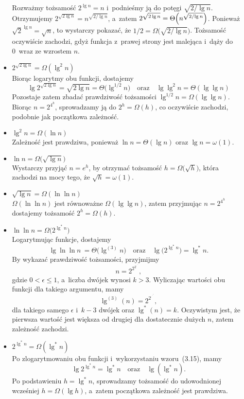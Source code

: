 \begin{itemize}
	Rozważmy tożsamość $2^{\lg n}=n$ i~podnieśmy ją do potęgi $\sqrt{2/\!\lg n}$. Otrzymujemy $2^{\sqrt{2\lg n}}=n^{\sqrt{2/\!\lg n}}$, a~zatem $2^{\sqrt{2\lg n}}=\Theta\Bigl(n^{\sqrt{2/\!\lg n}}\Bigr)$. Ponieważ $\sqrt{2}^{\lg n}=\sqrt{n}$, to wystarczy pokazać, że $1/2=\Omega\bigl(\!\sqrt{2/\!\lg n}\bigr)$. Tożsamość oczywiście zachodzi, gdyż funkcja z~prawej strony jest malejąca i~dąży do 0~wraz ze wzrostem $n$.
\item $2^{\sqrt{2\lg n}}=\Omega(\lg^2 n)$ \\
	Biorąc logarytmy obu funkcji, dostajemy
	\[
		\lg2^{\sqrt{2\lg n}} = \sqrt{2\lg n} = \Theta\bigl(\lg^{1/2}n\bigr) \quad\text{oraz}\quad \lg\lg^2n = \Theta(\lg\lg n)
	\]
	Pozostaje zatem zbadać prawdziwość tożsamości $\lg^{1/2}n=\Omega(\lg\lg n)$. Biorąc $n=2^{4^h}$, sprowadzamy ją do $2^h=\Omega(h)$, co oczywiście zachodzi, podobnie jak początkowa zależność.
\item $\lg^2n=\Omega(\ln n)$ \\
	Zależność jest prawdziwa, ponieważ $\ln n=\Theta(\lg n)$ oraz $\lg n=\omega(1)$.
\item $\ln n=\Omega\bigl(\!\sqrt{\lg n}\bigr)$ \\
	Wystarczy przyjąć $n=e^h$, by otrzymać tożsamość $h=\Omega\bigl(\!\sqrt{h}\bigr)$, która zachodzi na mocy tego, że $\sqrt{h}=\omega(1)$.
\item $\sqrt{\lg n}=\Omega(\ln\ln n)$ \\
	$\Omega(\ln\ln n)$ jest równoważne $\Omega(\lg\lg n)$, zatem przyjmując $n=2^{4^h}$ dostajemy tożsamość $2^h=\Omega(h)$.
\item $\ln\ln n=\Omega\bigl(2^{\lg^*n}\bigr)$ \\
	Logarytmując funkcje, dostajemy
	\[
		\lg\ln\ln n~= \Theta\bigl(\lg^{(3)}n\bigr) \quad\text{oraz}\quad \lg\bigl(2^{\lg^*n}\bigr) = \lg^*n.
	\]
	By wykazać prawdziwość tożsamości, przyjmijmy
	\[
		n = 2^{2^{2^{\cdot^{\cdot^{\cdot^\epsilon}}}}},
	\]
	gdzie $0<\epsilon\le1$, a~liczba dwójek wynosi $k>3$. Wyliczając wartości obu funkcji dla takiego argumentu, mamy
	\[
		\lg^{(3)}(n) = 2^{2^{\cdot^{\cdot^{\cdot^\epsilon}}}},
	\]
	dla takiego samego $\epsilon$ i~$k-3$ dwójek oraz $\lg^*(n)=k$. Oczywistym jest, że pierwsza wartość jest większa od drugiej dla dostatecznie dużych $n$, zatem zależność zachodzi.
\item $2^{\lg^*n}=\Omega(\lg^*n)$ \\
	Po zlogarytmowaniu obu funkcji i~wykorzystaniu wzoru~(3.15), mamy
	\[
		\lg2^{\lg^*n} = \lg^*n \quad\text{oraz}\quad \lg(\lg^*n).
	\]
	Po podstawieniu $h=\lg^*n$, sprowadzamy tożsamość do udowodnionej wcześniej $h=\Omega(\lg h)$, a~zatem początkowa zależność jest prawdziwa.

\end{itemize}
